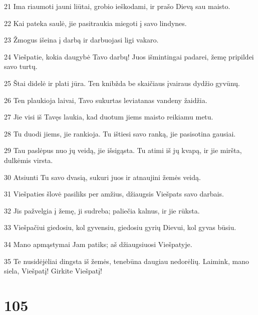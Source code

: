 \par 21 Ima riaumoti jauni liūtai, grobio ieškodami, ir prašo Dievą sau maisto. 
\par 22 Kai pateka saulė, jie pasitraukia miegoti į savo lindynes. 
\par 23 Žmogus išeina į darbą ir darbuojasi ligi vakaro. 
\par 24 Viešpatie, kokia daugybė Tavo darbų! Juos išmintingai padarei, žemę pripildei savo turtų. 
\par 25 Štai didelė ir plati jūra. Ten knibžda be skaičiaus įvairaus dydžio gyvūnų. 
\par 26 Ten plaukioja laivai, Tavo sukurtas leviatanas vandeny žaidžia. 
\par 27 Jie visi iš Tavęs laukia, kad duotum jiems maisto reikiamu metu. 
\par 28 Tu duodi jiems, jie rankioja. Tu ištiesi savo ranką, jie pasisotina gausiai. 
\par 29 Tau paslėpus nuo jų veidą, jie išsigąsta. Tu atimi iš jų kvapą, ir jie miršta, dulkėmis virsta. 
\par 30 Atsiunti Tu savo dvasią, sukuri juos ir atnaujini žemės veidą. 
\par 31 Viešpaties šlovė pasiliks per amžius, džiaugsis Viešpats savo darbais. 
\par 32 Jis pažvelgia į žemę, ji sudreba; paliečia kalnus, ir jie rūksta. 
\par 33 Viešpačiui giedosiu, kol gyvensiu, giedosiu gyrių Dievui, kol gyvas būsiu. 
\par 34 Mano apmąstymai Jam patiks; aš džiaugsiuosi Viešpatyje. 
\par 35 Te nusidėjėliai dingsta iš žemės, tenebūna daugiau nedorėlių. Laimink, mano siela, Viešpatį! Girkite Viešpatį!


\chapter{105}



